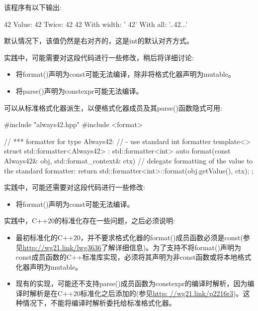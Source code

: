 该程序有以下输出:

\begin{shell}
42
Value: 42
Twice: 42 42
With width: ’     42’
With all:   ’..42...’
\end{shell}

默认情况下，该值仍然是右对齐的，这是int的默认对齐方式。

实践中，可能需要对这段代码进行一些修改，稍后将详细讨论:

\begin{itemize}
\item
将format()声明为const可能无法编译，除非将格式化器声明为mutable。

\item
将parse()声明为constexpr可能无法编译。
\end{itemize}


可以从标准格式化器派生，以便格式化器成员及其parse()函数隐式可用:


\begin{cpp}
#include "always42.hpp"
#include <format>

// *** formatter for type Always42:
// - use standard int formatter
template<>
struct std::formatter<Always42> : std::formatter<int>
{
	auto format(const Always42& obj, std::format_context& ctx) {
		// delegate formatting of the value to the standard formatter:
		return std::formatter<int>::format(obj.getValue(), ctx);
	}
};
\end{cpp}

实践中，可能还需要对这段代码进行一些修改:

\begin{itemize}
\item
将format()声明为const可能无法编译。
\end{itemize}


实践中，C++20的标准化存在一些问题，之后必须说明:

\begin{itemize}
\item
最初标准化的C++20，并不要求格式化器的format()成员函数必须是const(参见\url{http://wg21.link/lwg3636}了解详细信息)。为了支持不将format()声明为const成员函数的C++标准库实现，必须将其声明为非const函数或将本地格式化器声明为mutable。

\item
现有的实现，可能还不支持parse()成员函数为constexpr的编译时解析，因为编译时解析是在C++20标准化之后添加的(参见\url{http: //wg21.link/p2216r3})。这种情况下，不能将编译时解析委托给标准格式化器。
\end{itemize}

